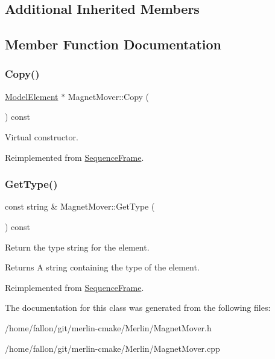 \subsection*{Additional Inherited Members}


\subsection{Member Function Documentation}
\mbox{\label{classMagnetMover_aff87bd41b6b3f0e158ccfd4f2a03aaf5}} 
\subsubsection{\texorpdfstring{Copy()}{Copy()}}
{\footnotesize\ttfamily \hyperlink{classModelElement}{Model\+Element} $\ast$ Magnet\+Mover\+::\+Copy (\begin{DoxyParamCaption}{ }\end{DoxyParamCaption}) const\hspace{0.3cm}{\ttfamily [virtual]}}

Virtual constructor. 

Reimplemented from \hyperlink{classSequenceFrame_a89a9046c330fa9955cd2e6b67b5c64f7}{Sequence\+Frame}.

\mbox{\label{classMagnetMover_a01e7a7b50824532e141fa18ba58c2758}} 
\subsubsection{\texorpdfstring{Get\+Type()}{GetType()}}
{\footnotesize\ttfamily const string \& Magnet\+Mover\+::\+Get\+Type (\begin{DoxyParamCaption}{ }\end{DoxyParamCaption}) const\hspace{0.3cm}{\ttfamily [virtual]}}

Return the type string for the element. \begin{DoxyReturn}{Returns}
A string containing the type of the element. 
\end{DoxyReturn}


Reimplemented from \hyperlink{classSequenceFrame_a062ab78de738251ac5af6c62b470edcf}{Sequence\+Frame}.



The documentation for this class was generated from the following files\+:\begin{DoxyCompactItemize}
\item 
/home/fallon/git/merlin-\/cmake/\+Merlin/Magnet\+Mover.\+h\item 
/home/fallon/git/merlin-\/cmake/\+Merlin/Magnet\+Mover.\+cpp\end{DoxyCompactItemize}
